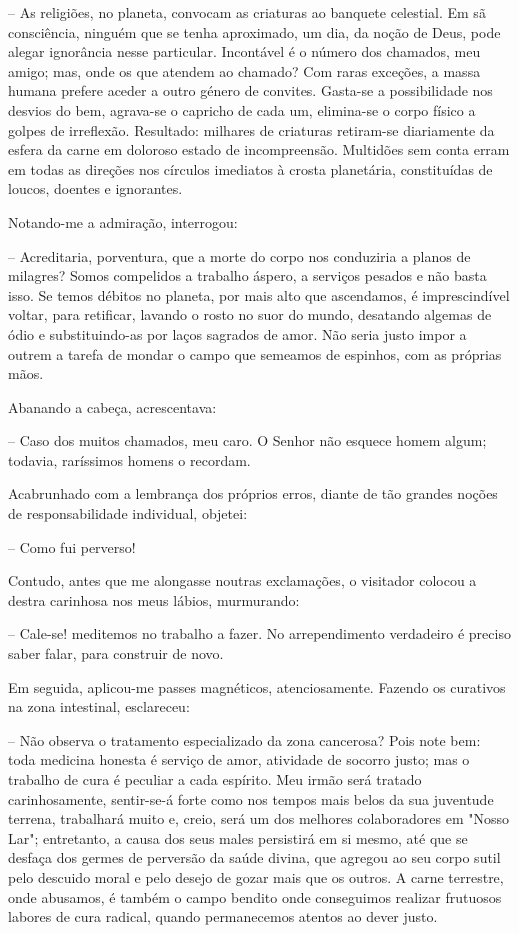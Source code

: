\documentclass[portuguese,12pt,a4paper]{scrbook}
\begin{document}
	– As religiões, no planeta, convocam as criaturas ao banquete celestial. Em sã consciência, ninguém que se tenha aproximado, um dia, da noção de Deus, pode alegar ignorância nesse particular. Incontável é o número dos chamados, meu amigo; mas, onde os que atendem ao chamado? Com raras exceções, a massa humana prefere aceder a outro género de convites. Gasta-se a possibilidade nos desvios do bem, agrava-se o capricho de cada um, elimina-se o corpo físico a golpes de irreflexão. Resultado: milhares de criaturas retiram-se diariamente da esfera da carne em doloroso estado de incompreensão. Multidões sem conta erram em todas as direções nos círculos imediatos à crosta planetária, constituídas de loucos, doentes e ignorantes.
	
	Notando-me a admiração, interrogou:
	
	– Acreditaria, porventura, que a morte do corpo nos conduziria a planos de milagres? Somos compelidos a trabalho áspero, a serviços pesados e não basta isso. Se temos débitos no planeta, por mais alto que ascendamos, é imprescindível voltar, para retificar, lavando o rosto no suor do mundo, desatando algemas de ódio e substituindo-as por laços sagrados de amor. Não seria justo impor a outrem a tarefa de mondar o campo que semeamos de espinhos, com as próprias mãos.
	
	Abanando a cabeça, acrescentava:
	
	– Caso dos muitos chamados, meu caro. O Senhor não esquece homem algum; todavia, raríssimos homens o recordam.
	
	Acabrunhado com a lembrança dos próprios erros, diante de tão grandes noções de responsabilidade individual, objetei:
	
	
	– Como fui perverso!
	
	Contudo, antes que me alongasse noutras exclamações, o visitador colocou a destra carinhosa nos meus lábios, murmurando:
	
	– Cale-se! meditemos no trabalho a fazer. No arrependimento verdadeiro é preciso saber falar, para construir de novo.
	
	Em seguida, aplicou-me passes magnéticos, atenciosamente. Fazendo os curativos na zona intestinal, esclareceu:
	
	– Não observa o tratamento especializado da zona cancerosa? Pois note bem: toda medicina honesta é serviço de amor, atividade de socorro justo; mas o trabalho de cura é peculiar a cada espírito. Meu irmão será tratado carinhosamente, sentir-se-á forte como nos tempos mais belos da sua juventude terrena, trabalhará muito e, creio, será um dos melhores colaboradores em "Nosso Lar"; entretanto, a causa dos seus males persistirá em si mesmo, até que se desfaça dos germes de perversão da saúde divina, que agregou ao seu corpo sutil pelo descuido moral e pelo desejo de gozar mais que os outros. A carne terrestre, onde abusamos, é também o campo bendito onde conseguimos realizar frutuosos labores de cura radical, quando permanecemos atentos ao dever justo.
	
\end{document}
